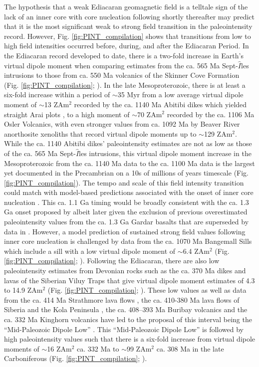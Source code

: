 The hypothesis that a weak Ediacaran geomagnetic field is a telltale sign of the lack of an inner core with core nucleation following shortly thereafter may predict that it is the most significant weak to strong field transition in the paleointensity record. However, Fig. \ref{fig:PINT_compilation} shows that transitions from low to high field intensities occurred before, during, and after the Ediacaran Period. In the Ediacaran record developed to date, there is a two-fold increase in Earth's virtual dipole moment when comparing estimates from the ca. 565 Ma Sept-$\hat{I}$les intrusions \citep{Bono2019a} to those from ca. 550 Ma volcanics of the Skinner Cove Formation (Fig. \ref{fig:PINT_compilation}; \citealp{Thallner2021a}). In the late Mesoproterozoic, there is at least a six-fold increase within a period of $\sim$35 Myr from a low average virtual dipole moment of $\sim$13 ZAm$^2$ recorded by the ca. 1140 Ma Abitibi dikes which yielded straight Arai plots \citep{Macouin2003a}, to a high moment of $\sim$70 ZAm$^2$ recorded by the ca. 1106 Ma Osler Volcanics, with even stronger values from ca. 1092 Ma by Beaver River anorthosite xenoliths that record virtual dipole moments up to $\sim$129 ZAm$^2$. While the ca. 1140 Abitibi dikes' paleointensity estimates are not as low as those of the ca. 565 Ma Sept-$\hat{I}$les intrusions, this virtual dipole moment increase in the Mesoproterozoic from the ca. 1140 Ma data to the ca. 1100 Ma data is the largest yet documented in the Precambrian on a 10s of millions of years timescale (Fig. \ref{fig:PINT_compilation}). The tempo and scale of this field intensity transition could match with model-based predictions associated with the onset of inner core nucleation \citep{Davies2021a}. This ca. 1.1 Ga timing would be broadly consistent with the ca. 1.3 Ga onset proposed by \citealp{Biggin2015a} albeit later given the exclusion of previous overestimated paleointensity values from the ca. 1.3 Ga Gardar basalts that are superseded by data in \citealp{Kodama2019a}. However, a model prediction of sustained strong field values following inner core nucleation is challenged by data from the ca. 1070 Ma Bangemall Sills which include a sill with a low virtual dipole moment of $\sim$6.4 ZAm$^2$ (Fig. \ref{fig:PINT_compilation};  \citealp{Lloyd2021b}). Following the Ediacaran, there are also low paleointensity estimates from Devonian rocks such as the ca. 370 Ma dikes and lavas of the Siberian Viluy Traps that give virtual dipole moment estimates of 4.3 to 14.9 ZAm$^2$ (Fig. \ref{fig:PINT_compilation}; \citealp{Hawkins2019a}). These low values as well as data from the ca. 414 Ma Strathmore lava flows \citep{Hawkins2021a}, the ca. 410-380 Ma lava flows of Siberia and the Kola Peninsula \citep{Shcherbakova2017a}, the ca. 408–393 Ma Buribay volcanics \citep{Shcherbakova2021a} and the ca. 332 Ma Kinghorn volcanics \citep{Hawkins2021a} have led to the proposal of this interval being the ``Mid-Paleozoic Dipole Low'' \citep{Hawkins2021a}. This ``Mid-Paleozoic Dipole Low'' is followed by high paleointensity values such that there is a six-fold increase from virtual dipole moments of $\sim$16 ZAm$^2$ ca. 332 Ma to $\sim$99 ZAm$^2$ ca. 308 Ma in the late Carboniferous (Fig. \ref{fig:PINT_compilation}; \citealp{Hawkins2021a}). 

